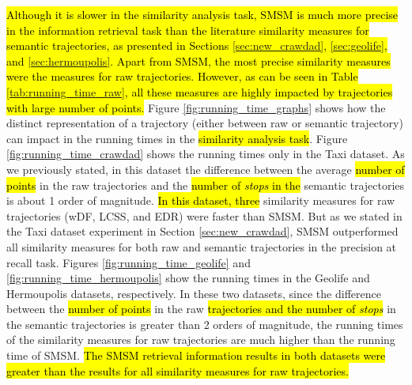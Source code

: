 \hl{Although it is slower in the similarity analysis task, SMSM is much more precise in the information retrieval task than the literature similarity measures for semantic trajectories, as presented in Sections {\ref{sec:new_crawdad}}, {\ref{sec:geolife}}, and {\ref{sec:hermoupolis}}. Apart from SMSM, the most precise similarity measures were the measures for raw trajectories. However, as can be seen in Table {\ref{tab:running_time_raw}}, all these measures are highly impacted by trajectories with large number of points.}
Figure \ref{fig:running_time_graphs} shows how the distinct representation of a trajectory (either between raw or semantic trajectory) can impact in the running times in the \hl{similarity analysis task}. Figure \ref{fig:running_time_crawdad} shows the running times only in the Taxi dataset. As we previously stated, in this dataset the difference between the average \hl{number of points} in the raw trajectories and the \hl{number of \emph{stops} in the} semantic trajectories is about 1 order of magnitude. \hl{In this dataset, three} similarity measures for raw trajectories (wDF, LCSS, and EDR) were faster than SMSM. But as we stated in the Taxi dataset experiment in Section \ref{sec:new_crawdad}, SMSM outperformed all similarity measures for both raw and semantic trajectories in the precision at recall task.
Figures \ref{fig:running_time_geolife} and \ref{fig:running_time_hermoupolis} show the running times in the Geolife and Hermoupolis datasets, respectively. In these two datasets, since the difference between the \hl{number of points} in the raw \hl{trajectories and the number of \emph{stops}} in the semantic trajectories is greater than 2 orders of magnitude, the running times of the similarity measures for raw trajectories are much higher than the running time of SMSM. \hl{The SMSM retrieval information results in both datasets were greater than the results for all similarity measures for raw trajectories.}

